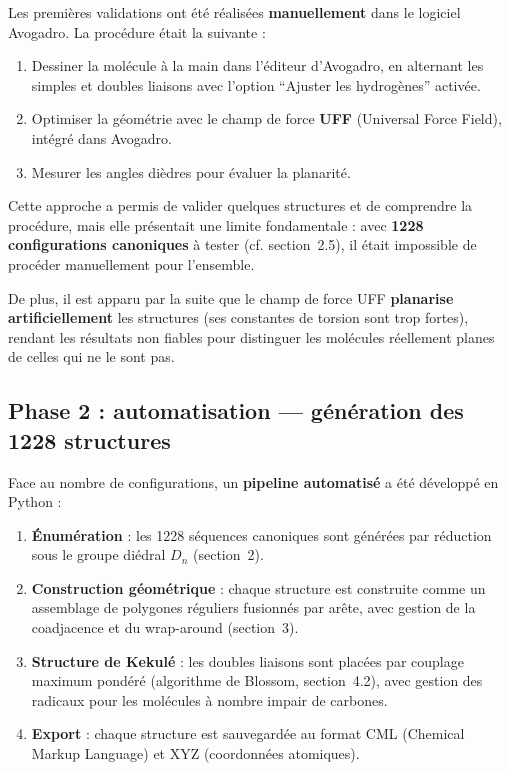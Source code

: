 \documentclass[a4paper,12pt]{article}
\begin{document}
Les premières validations ont été réalisées \textbf{manuellement} dans le logiciel Avogadro.
La procédure était la suivante :
\begin{enumerate}
  \item Dessiner la molécule à la main dans l'éditeur d'Avogadro, en alternant les simples
    et doubles liaisons avec l'option ``Ajuster les hydrogènes'' activée.
  \item Optimiser la géométrie avec le champ de force \textbf{UFF} (Universal Force Field),
    intégré dans Avogadro.
  \item Mesurer les angles dièdres pour évaluer la planarité.
\end{enumerate}

Cette approche a permis de valider quelques structures et de comprendre la procédure, mais
elle présentait une limite fondamentale : avec \textbf{1228 configurations canoniques} à tester
(cf. section~2.5), il était impossible de procéder manuellement pour l'ensemble.

De plus, il est apparu par la suite que le champ de force UFF \textbf{planarise artificiellement}
les structures (ses constantes de torsion sont trop fortes), rendant les résultats non fiables
pour distinguer les molécules réellement planes de celles qui ne le sont pas.

\subsection{Phase 2 : automatisation — génération des 1228 structures}

Face au nombre de configurations, un \textbf{pipeline automatisé} a été développé en Python :

\begin{enumerate}
  \item \textbf{Énumération} : les 1228 séquences canoniques sont générées par réduction sous
    le groupe diédral $D_n$ (section~2).
  \item \textbf{Construction géométrique} : chaque structure est construite comme un assemblage
    de polygones réguliers fusionnés par arête, avec gestion de la coadjacence et du
    wrap-around (section~3).
  \item \textbf{Structure de Kekulé} : les doubles liaisons sont placées par couplage maximum
    pondéré (algorithme de Blossom, section~4.2), avec gestion des radicaux pour les molécules
    à nombre impair de carbones.
  \item \textbf{Export} : chaque structure est sauvegardée au format CML (Chemical Markup
    Language) et XYZ (coordonnées atomiques).
\end{enumerate}
\end{document}
